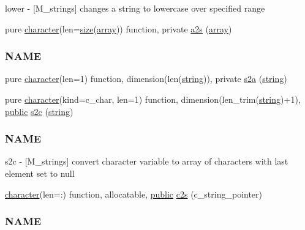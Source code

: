 \begin{DoxyCompactItemize}
\begin{DoxyCompactList}
lower -\/ \mbox{[}M\+\_\+strings\mbox{]} changes a string to lowercase over specified range \end{DoxyCompactList}\item 
pure \hyperlink{option__stopwatch_83_8txt_abd4b21fbbd175834027b5224bfe97e66}{character}(len=\hyperlink{what__overview_81_8txt_ab5692ed87074f1d5ec850a9ffa8b5af9}{size}(\hyperlink{intro__blas1_83_8txt_a89db1945e1a335ab0184c6a097821e32}{array})) function, private \hyperlink{namespacem__strings_a9365ae5277199446d93fc5208be2e9a5}{a2s} (\hyperlink{intro__blas1_83_8txt_a89db1945e1a335ab0184c6a097821e32}{array})
\begin{DoxyCompactList}\small\item\em \subsubsection*{N\+A\+ME}\end{DoxyCompactList}\item 
pure \hyperlink{option__stopwatch_83_8txt_abd4b21fbbd175834027b5224bfe97e66}{character}(len=1) function, dimension(len(\hyperlink{what__overview_81_8txt_a74cb7e955273b9f9157b4f0c18a38849}{string})), private \hyperlink{namespacem__strings_a5b05f337c8851871a4fb0b3cf56663cd}{s2a} (\hyperlink{what__overview_81_8txt_a74cb7e955273b9f9157b4f0c18a38849}{string})
\item 
pure \hyperlink{option__stopwatch_83_8txt_abd4b21fbbd175834027b5224bfe97e66}{character}(kind=c\+\_\+char, len=1) function, dimension(len\+\_\+trim(\hyperlink{what__overview_81_8txt_a74cb7e955273b9f9157b4f0c18a38849}{string})+1), \hyperlink{M__stopwatch_83_8txt_a2f74811300c361e53b430611a7d1769f}{public} \hyperlink{namespacem__strings_a9a3d38d8e7c4212d63487b9b46bec3b7}{s2c} (\hyperlink{what__overview_81_8txt_a74cb7e955273b9f9157b4f0c18a38849}{string})
\begin{DoxyCompactList}\small\item\em \subsubsection*{N\+A\+ME}

s2c -\/ \mbox{[}M\+\_\+strings\mbox{]} convert character variable to array of characters with last element set to null \end{DoxyCompactList}\item 
\hyperlink{option__stopwatch_83_8txt_abd4b21fbbd175834027b5224bfe97e66}{character}(len=\+:) function, allocatable, \hyperlink{M__stopwatch_83_8txt_a2f74811300c361e53b430611a7d1769f}{public} \hyperlink{namespacem__strings_a0a8c0c16a34208351523068686cb743b}{c2s} (c\+\_\+string\+\_\+pointer)
\begin{DoxyCompactList}\small\item\em \subsubsection*{N\+A\+ME}


\end{DoxyCompactList}
\end{DoxyCompactItemize}
